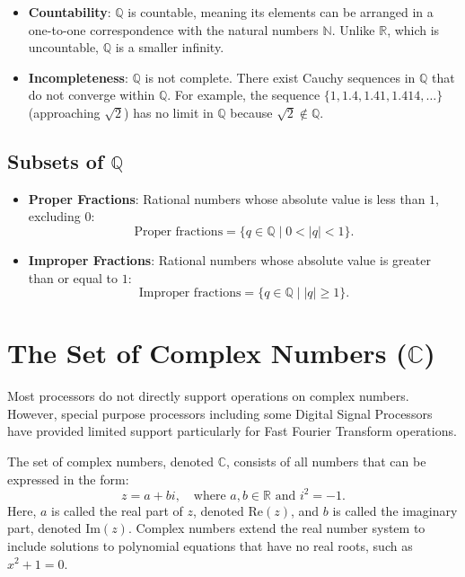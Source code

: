 \begin{itemize}
    \item \textbf{Countability}: \( \mathbb{Q} \) is countable, meaning its elements can be arranged in a one-to-one correspondence with the natural numbers \( \mathbb{N} \). Unlike \( \mathbb{R} \), which is uncountable, \( \mathbb{Q} \) is a smaller infinity.

\vspace{\baselineskip}\par
    \item \textbf{Incompleteness}: \( \mathbb{Q} \) is not complete. There exist Cauchy sequences in \( \mathbb{Q} \) that do not converge within \( \mathbb{Q} \). For example, the sequence \( \{1, 1.4, 1.41, 1.414, \dots\} \) (approaching \( \sqrt{2} \)) has no limit in \( \mathbb{Q} \) because \( \sqrt{2} \notin \mathbb{Q} \).
\end{itemize}


\subsection{Subsets of $\mathbb{Q}$}
\begin{itemize}
    \item \textbf{Proper Fractions}:
    Rational numbers whose absolute value is less than \( 1 \), excluding \( 0 \):
    \[
    \text{Proper fractions} = \{q \in \mathbb{Q} \mid 0 < |q| < 1\}.
    \]

    \item \textbf{Improper Fractions}:
    Rational numbers whose absolute value is greater than or equal to \( 1 \):
    \[
    \text{Improper fractions} = \{q \in \mathbb{Q} \mid |q| \geq 1\}.
    \]
\end{itemize}



\section{The Set of Complex Numbers (\( \mathbb{C} \))}
Most processors do not directly support operations on complex numbers. However, special purpose processors including some Digital Signal Processors have provided limited support particularly for Fast Fourier Transform operations. 

The set of complex numbers, denoted \( \mathbb{C} \), consists of all numbers that can be expressed in the form:
\[
z = a + bi, \quad \text{where } a, b \in \mathbb{R} \text{ and } i^2 = -1.
\]
Here, \( a \) is called the real part of \( z \), denoted \( \text{Re}(z) \), and \( b \) is called the imaginary part, denoted \( \text{Im}(z) \). Complex numbers extend the real number system to include solutions to polynomial equations that have no real roots, such as \( x^2 + 1 = 0 \).


